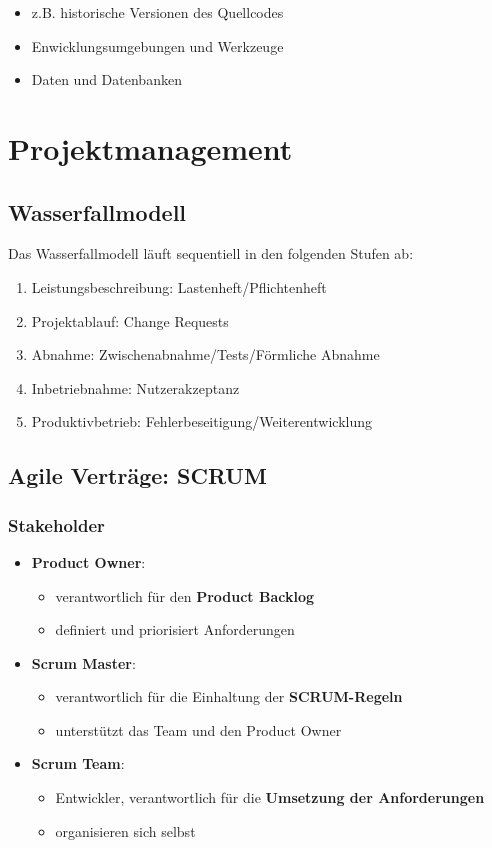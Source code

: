 \documentclass[12pt,A4]{extarticle}
\begin{document}
\begin{itemize}
  \item{z.B. historische Versionen des Quellcodes}
  \item{Enwicklungsumgebungen und Werkzeuge}
  \item{Daten und Datenbanken}
\end{itemize}

\section{Projektmanagement}
\subsection{Wasserfallmodell}
Das Wasserfallmodell läuft sequentiell in den folgenden Stufen ab:

\begin{enumerate}
  \item{Leistungsbeschreibung: Lastenheft/Pflichtenheft}
  \item{Projektablauf: Change Requests}
  \item{Abnahme: Zwischenabnahme/Tests/Förmliche Abnahme}
  \item{Inbetriebnahme: Nutzerakzeptanz}
  \item{Produktivbetrieb: Fehlerbeseitigung/Weiterentwicklung}
\end{enumerate}

\subsection{Agile Verträge: SCRUM}
\subsubsection{Stakeholder}

\begin{itemize}
  \item{\textbf{Product Owner}:
    \begin{itemize}
      \item{verantwortlich für den \textbf{Product Backlog}}
      \item{definiert und priorisiert Anforderungen}
    \end{itemize}
  }
  \item{\textbf{Scrum Master}:
    \begin{itemize}
      \item{verantwortlich für die Einhaltung der \textbf{SCRUM-Regeln}}
      \item{unterstützt das Team und den Product Owner}
    \end{itemize}
  }
  \item{\textbf{Scrum Team}:
    \begin{itemize}
      \item{Entwickler, verantwortlich für die \textbf{Umsetzung der Anforderungen}}
      \item{organisieren sich selbst}
    \end{itemize}
  }
\end{itemize}
\end{document}
